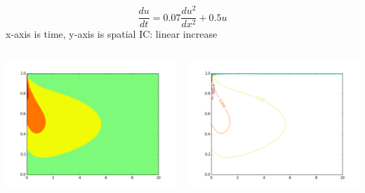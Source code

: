 \documentclass{beamer}
\begin{document}
\begin{frame}
     $$
    \frac{du}{dt} = 0.07\frac{du^{2}}{dx^{2}} + 0.5u
    $$
    \newline
    x-axis is time, y-axis is spatial
    \newline
    IC: linear increase
    \newline
    
  \begin{columns}[T]
    \begin{column}{.5\textwidth}
   
    \includegraphics[scale=0.25]{hm2.pdf}
    
    \end{column}
    
    \begin{column}{.5\textwidth}
   
    \includegraphics[scale=0.25]{cm2.pdf}
  
    \end{column}
  \end{columns}
\end{frame}
\end{document}
